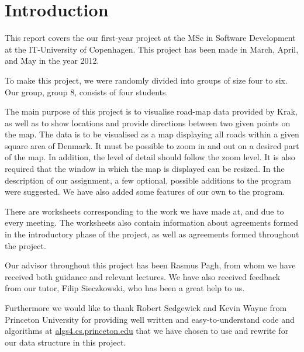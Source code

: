 \section{Introduction}

This report covers the our first-year project at the MSc in Software Development at the IT-University of Copenhagen. This project has been made in March, April, and May in the year 2012. 

To make this project, we were randomly divided into groups of size four to six. Our group, group 8, consists of four students. 

The main purpose of this project is to visualise road-map data provided by Krak, as well as to show locations and provide directions between two given points on the map. The data is to be visualised as a map displaying all roads within a given square area of Denmark.
It must be possible to zoom in and out on a desired part of the map. In addition, the level of detail should follow the zoom level. It is also required that the window in which the map is displayed can be resized. In the description of our assignment, a few optional, possible additions to the program were suggested. We have also added some features of our own to the program.

There are worksheets corresponding to the work we have made at, and due to every meeting. The worksheets also contain information about agreements formed in the introductory phase of the project, as well as agreements formed throughout the project.

Our advisor throughout this project has been Rasmus Pagh, from whom we have received both guidance and relevant lectures. We have also received feedback from our tutor, Filip Sieczkowski, who has been a great help to us.

Furthermore we would like to thank Robert Sedgewick and Kevin Wayne from Princeton University for providing well written and easy-to-understand code and algorithms at \url{algs4.cs.princeton.edu} that we have chosen to use and rewrite for our data structure in this project.